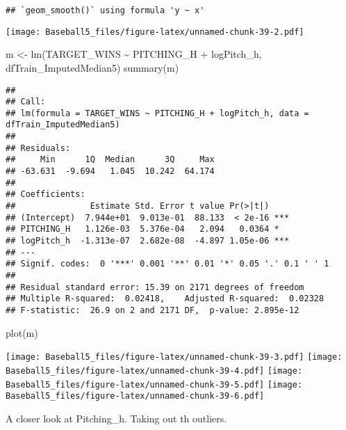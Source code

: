 \documentclass[
]{article}
\newenvironment{Shaded}{\begin{snugshade}}{\end{snugshade}}
\newcommand{\FunctionTok}[1]{\textcolor[rgb]{0.00,0.00,0.00}{#1}}
\newcommand{\NormalTok}[1]{#1}
\newcommand{\OtherTok}[1]{\textcolor[rgb]{0.56,0.35,0.01}{#1}}
\newcommand{\SpecialCharTok}[1]{\textcolor[rgb]{0.00,0.00,0.00}{#1}}
\begin{document}
\begin{verbatim}
## `geom_smooth()` using formula 'y ~ x'
\end{verbatim}

\texttt{[image: Baseball5\_files/figure-latex/unnamed-chunk-39-2.pdf]}

\begin{Shaded}
\begin{Highlighting}[]
\NormalTok{m }\OtherTok{\textless{}{-}} \FunctionTok{lm}\NormalTok{(TARGET\_WINS }\SpecialCharTok{\textasciitilde{}}\NormalTok{ PITCHING\_H }\SpecialCharTok{+}\NormalTok{ logPitch\_h, dfTrain\_ImputedMedian5)}
\FunctionTok{summary}\NormalTok{(m)}
\end{Highlighting}
\end{Shaded}

\begin{verbatim}
## 
## Call:
## lm(formula = TARGET_WINS ~ PITCHING_H + logPitch_h, data = dfTrain_ImputedMedian5)
## 
## Residuals:
##     Min      1Q  Median      3Q     Max 
## -63.631  -9.694   1.045  10.242  64.174 
## 
## Coefficients:
##               Estimate Std. Error t value Pr(>|t|)    
## (Intercept)  7.944e+01  9.013e-01  88.133  < 2e-16 ***
## PITCHING_H   1.126e-03  5.376e-04   2.094   0.0364 *  
## logPitch_h  -1.313e-07  2.682e-08  -4.897 1.05e-06 ***
## ---
## Signif. codes:  0 '***' 0.001 '**' 0.01 '*' 0.05 '.' 0.1 ' ' 1
## 
## Residual standard error: 15.39 on 2171 degrees of freedom
## Multiple R-squared:  0.02418,    Adjusted R-squared:  0.02328 
## F-statistic:  26.9 on 2 and 2171 DF,  p-value: 2.895e-12
\end{verbatim}

\begin{Shaded}
\begin{Highlighting}[]
\FunctionTok{plot}\NormalTok{(m)}
\end{Highlighting}
\end{Shaded}

\texttt{[image: Baseball5\_files/figure-latex/unnamed-chunk-39-3.pdf]}
\texttt{[image: Baseball5\_files/figure-latex/unnamed-chunk-39-4.pdf]}
\texttt{[image: Baseball5\_files/figure-latex/unnamed-chunk-39-5.pdf]}
\texttt{[image: Baseball5\_files/figure-latex/unnamed-chunk-39-6.pdf]}

A closer look at Pitching\_h. Taking out th outliers.
\end{document}
